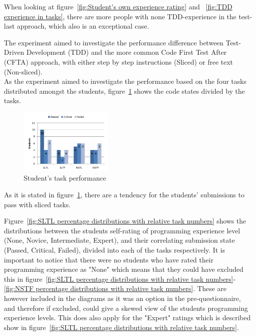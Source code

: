 \documentclass{sig-alternate-05-2015}
\begin{document}
When looking at figure~\ref{fig:Student's own experience rating} and ~\ref{fig:TDD experience in tasks}, there are more people with none TDD-experience in the test-last approach, which also is an exceptional case.

The experiment aimed to investigate the performance difference between Test-Driven Development (TDD) and the more common Code First Test After (CFTA) approach, with either step by step instructions (Sliced) or free text (Non-sliced).\\

As the experiment aimed to investigate the performance based on the four tasks distributed amongst the students, figure~\ref{fig:Student's task performance} shows the code states divided by the tasks.

\begin{figure}[H]
	\centering
	\includegraphics[width=0.4\textwidth]{img05}
	\caption{Student's task performance}
	\label{fig:Student's task performance}
\end{figure}

As it is stated in figure~\ref{fig:Student's task performance}, there are a tendency for the students' submissions to pass with sliced tasks.

Figure~\ref{fig:SLTL percentage distributions with relative task numbers} shows the distributions between the students self-rating of programming experience level (None, Novice, Intermediate, Expert), and their correlating submission state (Passed, Critical, Failed), divided into each of the tasks respectively.
It is important to notice that there were no students who have rated their programming experience  as "None" which means that they could have excluded this in figure~\ref{fig:SLTL percentage distributions with relative task numbers}-\ref{fig:NSTF percentage distributions with relative task numbers}. These are however included in the diagrams as it was an option in the pre-questionnaire, and therefore if excluded, could give a skewed view of the students programming experience levels. This does also apply for the "Expert" ratings which is described show in figure~\ref{fig:SLTL percentage distributions with relative task numbers}.
\end{document}

